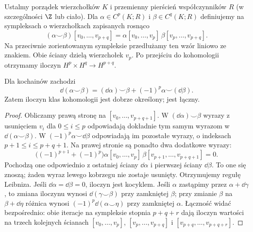 \begin{definicja}
\label{def:kubek-16}
Ustalmy porządek wierzchołków $K$ i przemienny
pierścień współczynników $R$ (w szczególności $\Z$ lub ciało).
Dla $\alpha\in C^p(K;R)$ i $\beta\in C^q(K;R)$ definiujemy
na sympleksach o wierzchołkach zapisanych rosnąco
\[
(\alpha\smile\beta)
 [v_0,\ldots,v_{p+q}]
=\alpha[v_0,\ldots,v_p]\,
 \beta[v_p,\ldots,v_{p+q}].
\]
Na przeciwnie zorientowanym sympleksie przedłużamy ten
wzór liniowo ze znakiem. Obie ściany dzielą wierzchołek $v_p$.
Po przejściu do kohomologii otrzymamy
iloczyn $H^p\times H^q\to H^{p+q}$.
\end{definicja}

\begin{stwierdzenie}
\label{prop:kubek-leibniz-16}
Dla kochainów zachodzi
\[
 \dd(\alpha\smile\beta)
 =(\dd\alpha)\smile\beta
       +(-1)^p\alpha\smile(\dd\beta).
\]
Zatem iloczyn klas kohomologii jest
dobrze określony; jest łączny.
\end{stwierdzenie}
\begin{proof}
Obliczamy prawą stronę na $[v_0,\ldots,v_{p+q+1}]$.
W $(\dd\alpha)\smile\beta$ wyrazy z usunięciem
$v_i$ dla $0\leq i\leq p$ odpowiadają dokładnie
tym samym wyrazom w $\dd(\alpha\smile\beta)$.
W $(-1)^p\alpha\smile\dd\beta$ odpowiadają im
pozostałe wyrazy, o indeksach $p+1\leq i\leq p+q+1$.
Na prawej stronie są ponadto dwa dodatkowe wyrazy:
\[
 \bigl((-1)^{p+1}+(-1)^p\bigr)
 \alpha[v_0,\ldots,v_p]\,
 \beta[v_{p+1},\ldots,v_{p+q+1}]=0.
\]
Pochodzą one odpowiednio z ostatniej ściany
$\dd\alpha$ i pierwszej ściany $\dd\beta$.
To one się znoszą; żaden wyraz lewego kobrzegu
nie zostaje usunięty. Otrzymujemy regułę Leibniza.
Jeśli $\dd\alpha=\dd\beta=0$,
iloczyn jest kocyklem.
Jeśli $\alpha$ zastąpimy przez
$\alpha+\dd\gamma$, to zmiana
iloczynu wynosi
$\dd(\gamma\smile\beta)$
przy zamkniętej $\beta$;
przy zmianie $\beta$ na $\beta+\dd\eta$ różnica
wynosi $(-1)^p\dd(\alpha\smile\eta)$ przy zamkniętej $\alpha$.
Łączność widać bezpośrednio:
obie iteracje na sympleksie
stopnia $p+q+r$ dają iloczyn
wartości na trzech kolejnych
ścianach
$[v_0,\ldots,v_p]$,
$[v_p,\ldots,v_{p+q}]$ i
$[v_{p+q},\ldots,v_{p+q+r}]$.
\end{proof}

